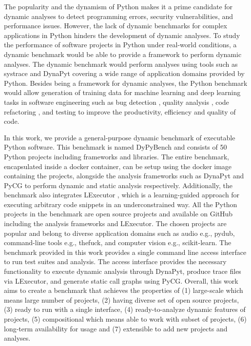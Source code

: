 The popularity and the dynamism of Python makes it a prime candidate for dynamic analyses to detect programming errors, security vulnerabilities, and performance issues. 
However, the lack of dynamic benchmarks for complex applications in Python hinders the development of dynamic analyses.
To study the performance of software projects in Python under real-world conditions, a dynamic benchmark would be able to provide a framework to perform dynamic analyses.
The dynamic benchmark would perform analyses using tools such as systrace \cite{systrace} and DynaPyt \cite{DynaPyt2022} covering a wide range of application domains provided by Python.
Besides being a framework for dynamic analyses, the Python benchmark would allow generation of training data for machine learning and deep learning tasks in software engineering such as bug detection \cite{DeepBugs2018}, quality analysis \cite{Code_analysis_1, Code_analysis_2}, code refactoring \cite{code_refactoring}, and testing \cite{testing_1, testing_2, testing_3} to improve the productivity, efficiency and quality of code.

In this work, we provide a general-purpose dynamic benchmark of executable Python software. This benchmark is named DyPyBench and consists of 50 Python projects including frameworks and libraries.
The entire benchmark, encapsulated inside a docker container, can be setup using the docker image containing the projects, alongside the analysis frameworks such as DynaPyt \cite{DynaPyt2022} and PyCG \cite{PyCG_2021} to perform dynamic and static analysis respectively. Additionally, the benchmark also integrates LExecutor \cite{LExecutor_2023}, which is a learning-guided approach for executing arbitrary code snippets in an underconstrained way. 
All the Python projects in the benchmark are open source projects and available on GitHub \cite{github} including the analysis frameworks and LExecutor.
The chosen projects are popular and belong to diverse application domains such as audio e.g., pydub, command-line tools e.g., thefuck, and computer vision e.g., scikit-learn.
The benchmark provided in this work provides a single command line access interface to run test suites and analysis.
The access interface provides the necessary functionality to execute dynamic analysis through DynaPyt, produce trace files via LExecutor, and generate static call graphs using PyCG.
Overall, this work aims to create a benchmark that achieves the properties of (1) large-scale which means large number of projects, (2) having diverse set of open source projects, (3) ready to run with a single interface, (4) ready-to-analyze dynamic features of projects, (5) compositional which means able to work with subset of projects, (6) long-term availability for usage and (7) extensible to add new projects and analyses. 


